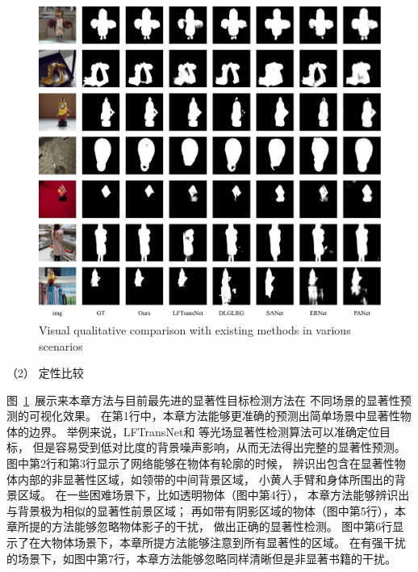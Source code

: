 \begin{figure}[!ht]
	\centering
	\includegraphics[width=\linewidth]{figures/chapter4/figures_comp}
	{Visual qualitative comparison with existing methods in various scenarios}
	\label{chpt4:fig:comparison_4}
\end{figure}


（2）
定性比较


图~\ref{chpt4:fig:comparison_4}~展示来本章方法与目前最先进的显著性目标检测方法在
不同场景的显著性预测的可视化效果。
在第1行中，本章方法能够更准确的预测出简单场景中显著性物体的边界。
举例来说，LFTransNet和
等光场显著性检测算法可以准确定位目标，
但是容易受到低对比度的背景噪声影响，从而无法得出完整的显著性预测。
图中第2行和第3行显示了网络能够在物体有轮廓的时候，
辨识出包含在显著性物体内部的非显著性区域，如领带的中间背景区域，
小黄人手臂和身体所围出的背景区域。
在一些困难场景下，比如透明物体（图中第4行），
本章方法能够辨识出与背景极为相似的显著性前景区域；
再如带有阴影区域的物体（图中第5行），本章所提的方法能够忽略物体影子的干扰，
做出正确的显著性检测。
图中第6行显示了在大物体场景下，本章所提方法能够注意到所有显著性的区域。
在有强干扰的场景下，如图中第7行，本章方法能够忽略同样清晰但是非显著书籍的干扰。


